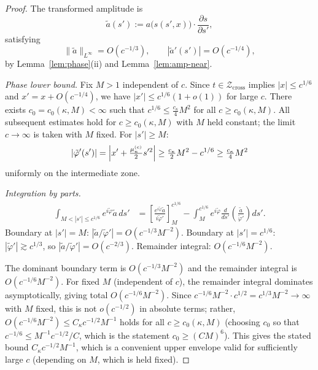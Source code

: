 \documentclass[12pt,a4paper]{amsart}
\theoremstyle{definition}
\theoremstyle{remark}
\newcommand{\Zcross}{\mathcal{Z}_{\mathrm{cross}}}
\begin{document}
\begin{proof}
The transformed amplitude is
\begin{equation}
\label{eq:atilde-def}
  \tilde{a}(s') := a\bigl(s(s',x)\bigr)
  \cdot \frac{\partial s}{\partial s'},
\end{equation}
satisfying
\begin{equation}
\label{eq:atilde-bounds}
  \|\tilde{a}\|_{L^\infty} = O(c^{-1/3}),
  \qquad
  |\tilde{a}'(s')| = O(c^{-1/4}),
\end{equation}
by Lemma~\ref{lem:phase}(ii) and Lemma~\ref{lem:amp-near}.

\textit{Phase lower bound.}
Fix $M > 1$ independent of $c$.
Since $t \in \Zcross$ implies $|x| \le c^{1/6}$
and $x' = x + O(c^{-1/4})$,
we have $|x'| \le c^{1/6}(1+o(1))$ for large $c$.
There exists $c_0 = c_0(\kappa, M) < \infty$ such that
$c^{1/6} \le \tfrac{c_\kappa}{4}M^2$
for all $c \ge c_0(\kappa, M)$.
All subsequent estimates hold for
$c \ge c_0(\kappa, M)$ with $M$ held constant;
the limit $c \to \infty$ is taken with $M$ fixed.
For $|s'| \ge M$:
\[
  |\tilde\varphi'(s')| = \Bigl|x' + \tfrac{\mu_n^{(c)}}{2}s'^2\Bigr|
  \ge \tfrac{c_\kappa}{2}M^2 - c^{1/6}
  \ge \tfrac{c_\kappa}{4}M^2
\]
uniformly on the intermediate zone.

\textit{Integration by parts.}
\begin{align*}
  \int_{M < |s'| \le c^{1/6}}
  e^{i\tilde\varphi}\tilde{a}\,ds'
  &=
  \left[\frac{e^{i\tilde\varphi}\tilde{a}}
             {i\tilde\varphi'}\right]_{M}^{c^{1/6}}
  - \int_{M}^{c^{1/6}}
    e^{i\tilde\varphi}
    \frac{d}{ds'}\!\left(\frac{\tilde{a}}{\tilde\varphi'}\right)
    ds'.
\end{align*}
Boundary at $|s'|=M$:
$|\tilde{a}/\tilde\varphi'| = O(c^{-1/3}M^{-2})$.
Boundary at $|s'|=c^{1/6}$:
$|\tilde\varphi'| \gtrsim c^{1/3}$,
so $|\tilde{a}/\tilde\varphi'| = O(c^{-2/3})$.
Remainder integral: $O(c^{-1/6}M^{-2})$.

The dominant boundary term is $O(c^{-1/3}M^{-2})$
and the remainder integral is $O(c^{-1/6}M^{-2})$.
For fixed $M$ (independent of $c$), the
remainder integral dominates asymptotically,
giving total $O(c^{-1/6}M^{-2})$.
Since $c^{-1/6}M^{-2} \cdot c^{1/2} = c^{1/3}M^{-2} \to \infty$
with $M$ fixed, this is not $o(c^{-1/2})$ in absolute terms;
rather, $O(c^{-1/6}M^{-2}) \le C_\kappa c^{-1/2} M^{-1}$
holds for all $c \ge c_0(\kappa, M)$
(choosing $c_0$ so that $c^{-1/6} \le M^{-1}c^{-1/2}/C$,
which is the statement $c_0 \ge (CM)^6$).
This gives the stated bound $C_\kappa c^{-1/2} M^{-1}$,
which is a convenient upper envelope
valid for sufficiently large $c$
(depending on $M$, which is held fixed).
\end{proof}
\end{document}
